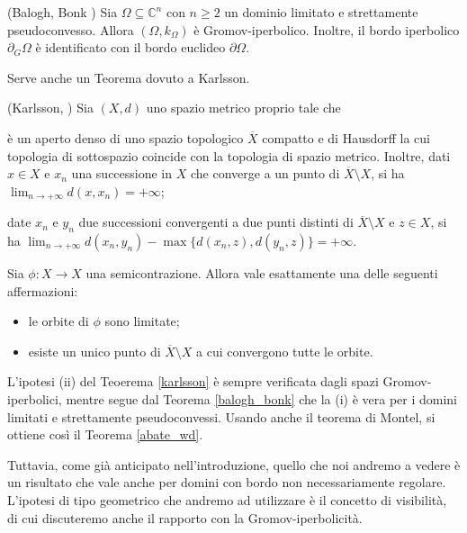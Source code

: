 \begin{thm} \label{balogh_bonk}
    (Balogh, Bonk \cite[Theorem 1.4]{BB}) Sia $\Omega \subseteq \mathbb{C}^n$ con $n \ge 2$ un dominio limitato e strettamente pseudoconvesso. Allora $(\Omega,k_{\Omega})$ è Gromov-iperbolico. Inoltre, il bordo iperbolico $\partial_G\Omega$ è identificato con il bordo euclideo $\partial\Omega$.
\end{thm}

Serve anche un Teorema dovuto a Karlsson.

\begin{thm} \label{karlsson}
    (Karlsson, \cite[Corollary 3.7]{Ka}) Sia $(X,d)$ uno spazio metrico proprio tale che
    \begin{nlist}
        \item è un aperto denso di uno spazio topologico $\overline{X}$ compatto e di Hausdorff la cui topologia di sottospazio coincide con la topologia di spazio metrico. Inoltre, dati $x \in X$ e $x_n$ una successione in $X$ che converge a un punto di $\overline{X}\setminus X$, si ha $\displaystyle\lim_{n\longrightarrow+\infty}d(x,x_n)=+\infty$;
        \item date $x_n$ e $y_n$ due successioni convergenti a due punti distinti di $\overline{X}\setminus X$ e $z \in X$, si ha $\displaystyle\lim_{n\longrightarrow+\infty} d(x_n,y_n)-\max\{d(x_n,z),d(y_n,z)\}=+\infty$.
    \end{nlist}
    Sia $\phi:X \longrightarrow X$ una semicontrazione. Allora vale esattamente una delle seguenti affermazioni:
    \begin{itemize}
        \item le orbite di $\phi$ sono limitate;
        \item esiste un unico punto di $\overline{X}\setminus X$ a cui convergono tutte le orbite.
    \end{itemize}
\end{thm}

L'ipotesi (ii) del Teoerema \ref{karlsson} è sempre verificata dagli spazi Gromov-iperbolici, mentre segue dal Teorema \ref{balogh_bonk} che la (i) è vera per i domini limitati e strettamente pseudoconvessi. Usando anche il teorema di Montel, si ottiene così il Teorema \ref{abate_wd}.

Tuttavia, come già anticipato nell'introduzione, quello che noi andremo a vedere è un risultato che vale anche per domini con bordo non necessariamente regolare. L'ipotesi di tipo geometrico che andremo ad utilizzare è il concetto di visibilità, di cui discuteremo anche il rapporto con la Gromov-iperbolicità.
